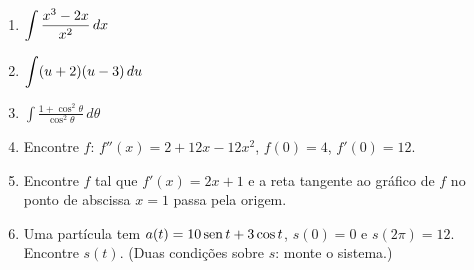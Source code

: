 \begin{exercicios}
\begin{enumerate}[leftmargin=1.6em, itemsep=2pt, label=\textbf{2.\arabic*}]
\item $\displaystyle\int \frac{x^3-2x}{x^2}\,dx$
\item $\displaystyle\int (u+2)(u-3)\,du$
\item $\displaystyle\int \frac{1+\cos^2\theta}{\cos^2\theta}\,d\theta$
\item Encontre $f$: $f''(x)=2+12x-12x^2$, $f(0)=4$, $f'(0)=12$.
\item Encontre $f$ tal que $f'(x)=2x+1$ e a reta tangente ao gráfico de $f$ no ponto de abscissa $x=1$ passa pela origem.
\item Uma partícula tem $a(t)=10\operatorname{sen} t+3\cos t$, $s(0)=0$ e $s(2\pi)=12$. Encontre $s(t)$. (Duas condições sobre $s$: monte o sistema.)
\end{enumerate}
\end{exercicios}
